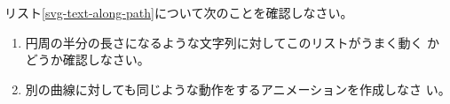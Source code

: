 \begin{Problem}\upshape
リスト\ref{svg-text-along-path}について次のことを確認しなさい。
\begin{enumerate}
 \item 円周の半分の長さになるような文字列に対してこのリストがうまく動く
 かどうか確認しなさい。
 \item 別の曲線に対しても同じような動作をするアニメーションを作成しなさ
 い。
\end{enumerate}
\end{Problem}
\fi
\iffalse%
\ShowGraphicPT{0.8}{ht}{difference-width}
    {文字が隠れています}{difference-width}
\fi
